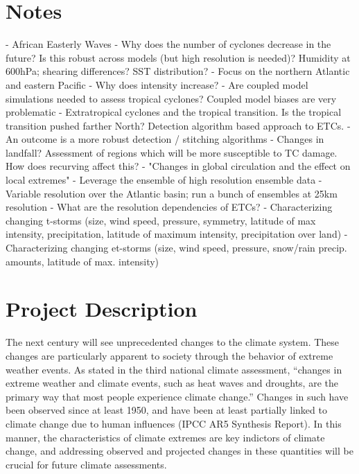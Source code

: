 \documentclass[11pt]{article}
\begin{document}
\appendix

\addtocounter{section}{3}

\section*{Notes}

- African Easterly Waves
- Why does the number of cyclones decrease in the future?  Is this robust across models (but high resolution is needed)?  Humidity at 600hPa; shearing differences?  SST distribution?
- Focus on the northern Atlantic and eastern Pacific
- Why does intensity increase?
- Are coupled model simulations needed to assess tropical cyclones?  Coupled model biases are very problematic
- Extratropical cyclones and the tropical transition.  Is the tropical transition pushed farther North?  Detection algorithm based approach to ETCs.
- An outcome is a more robust detection / stitching algorithms
- Changes in landfall?  Assessment of regions which will be more susceptible to TC damage.  How does recurving affect this?
- "Changes in global circulation and the effect on local extremes"
- Leverage the ensemble of high resolution ensemble data
- Variable resolution over the Atlantic basin; run a bunch of ensembles at 25km resolution
- What are the resolution dependencies of ETCs?
- Characterizing changing t-storms (size, wind speed, pressure, symmetry, latitude of max intensity, precipitation, latitude of maximum intensity, precipitation over land)
- Characterizing changing et-storms (size, wind speed, pressure, snow/rain precip. amounts, latitude of max. intensity)
 
\section{Project Description}

The next century will see unprecedented changes to the climate system.  These changes are particularly apparent to society through the behavior of extreme weather events. As stated in the third national climate assessment, ``changes in extreme weather and climate events, such as heat waves and droughts, are the primary way that most people experience climate change.''  Changes in such have been observed since at least 1950, and have been at least partially linked to climate change due to human influences (IPCC AR5 Synthesis Report).  In this manner, the characteristics of climate extremes are key indictors of climate change, and addressing observed and projected changes in these quantities will be crucial for future climate assessments.
\end{document}
